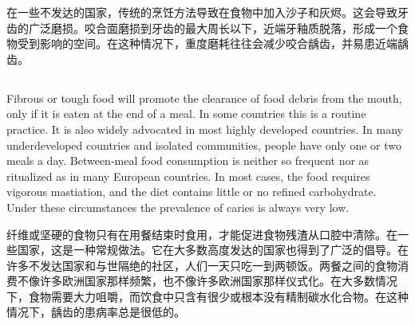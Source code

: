 \documentclass[]{article}
\begin{document}
在一些不发达的国家，传统的烹饪方法导致在食物中加入沙子和灰烬。这会导致牙齿的广泛磨损。咬合面磨损到牙齿的最大周长以下，近端牙釉质脱落，形成一个食物受到影响的空间。在这种情况下，重度磨耗往往会减少咬合龋齿，并易患近端龋齿。

\subsection{}
\begin{spacing}{2.0}
	{\Large Fibrous or tough food will promote the clearance of food debris from the mouth, only if it is eaten at the end of a meal. In some
	countries this is a routine	practice. It is also widely advocated in most highly developed countries. In many underdeveloped countries and isolated communities, people have only one or two	meals a day. Between-meal food consumption is neither so frequent nor as ritualized as in many European countries. In most cases, the food requires vigorous mastiation, and the diet contains little or no refined carbohydrate. Under these circumstances the prevalence of caries is always very low.}\newline
\end{spacing}

纤维或坚硬的食物只有在用餐结束时食用，才能促进食物残渣从口腔中清除。在一些国家，这是一种常规做法。它在大多数高度发达的国家也得到了广泛的倡导。在许多不发达国家和与世隔绝的社区，人们一天只吃一到两顿饭。两餐之间的食物消费不像许多欧洲国家那样频繁，也不像许多欧洲国家那样仪式化。在大多数情况下，食物需要大力咀嚼，而饮食中只含有很少或根本没有精制碳水化合物。在这种情况下，龋齿的患病率总是很低的。
\end{document}
